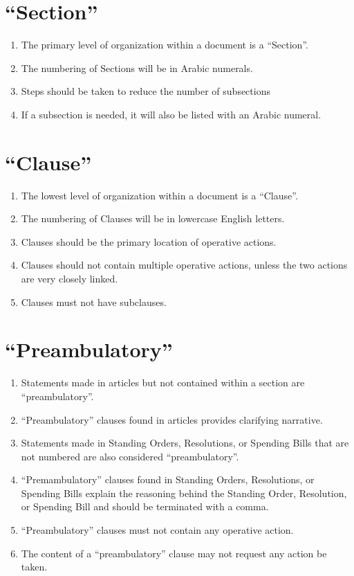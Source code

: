 \documentclass[12pt, letterpaper]{report}
\begin{document}
\begin{linenumbers}
    	\section{``Section''}
        \begin{enumerate}
            \renewcommand{\labelenumi}{\bfseries\alph{enumi})}
        	    \item The primary level of organization within a document is a ``Section''.
        	    \item The numbering of Sections will be in Arabic numerals.
        	    \item Steps should be taken to reduce the number of subsections
        	    \item If a subsection is needed, it will also be listed with an Arabic numeral.
    	    \end{enumerate}
    	\section{``Clause''}
    	\begin{enumerate}
            \renewcommand{\labelenumi}{\bfseries\alph{enumi})}
        	    \item The lowest level of organization within a document is a ``Clause''.
        	    \item The numbering of Clauses will be in lowercase English letters.
        	    \item Clauses should be the primary location of operative actions.
        	    \item Clauses should not contain multiple operative actions, unless the two actions are very closely linked.
        	    \item Clauses must not have subclauses.
	     \end{enumerate}
	    \section{``Preambulatory''}
	    	\begin{enumerate}
            \renewcommand{\labelenumi}{\bfseries\alph{enumi})}
            	\item Statements made in articles but not contained within a section are ``preambulatory''.
        	    \item ``Preambulatory'' clauses found in articles provides clarifying narrative.
        	    \item Statements made in Standing Orders, Resolutions, or Spending Bills that are not numbered are also considered ``preambulatory''.
        	    \item ``Premambulatory'' clauses found in Standing Orders, Resolutions, or Spending Bills explain the reasoning behind the Standing Order, Resolution, or Spending Bill and should be terminated with a comma.
        	    \item ``Preambulatory'' clauses must not contain any operative action.
        	    \item The content of a ``preambulatory'' clause may not request any action be taken. 
            \end{enumerate} 

\end{linenumbers}
\end{document}
